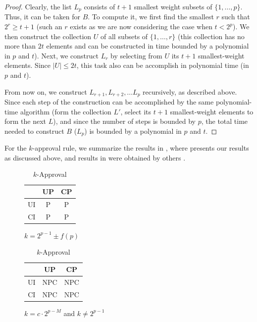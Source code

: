 \begin{proof}
Clearly, the list $L_p$ consists of $t+1$ smallest weight subsets of
$\{1,\ldots,p\}$. Thus, it can be taken for $B$. To compute it, we first
find the smallest $r$ such that $2^r\geq t+1$ (such an $r$ exists as
we are now considering the case when $t < 2^p$). We then construct the 
collection $U$ of all subsets of $\{1,\ldots, r\}$ (this collection 
has no more than $2t$ elements and can be constructed in time bounded 
by a polynomial in $p$ and $t$). Next, we construct $L_r$ by selecting 
from $U$ its $t+1$ smallest-weight elements. Since $|U|\leq 2t$, this task
also can be accomplish in polynomial time (in $p$ and $t$).

From now on, we construct $L_{r+1},L_{r+2},\ldots L_p$ recursively, as 
described above. Since each step of the construction can be accomplished
by the same polynomial-time algorithm (form the collection $L'$, select
its $t+1$ smallest-weight elements to form the next $L$), and since
the number of steps is bounded by $p$, the total time needed to construct
$B$ ($L_p$) is bounded by a polynomial in $p$ and $t$.  
\end{proof}


For the $k$-approval rule, we summarize the results in ,
where  presents our results as discussed above,
and results in  were obtained by others
\cite{lang:aggLP}.
\begin{table}
	\centering
  \begin{subfigure}[b]{0.5\textwidth}
		\centering
		\begin{tabular}[0.5\textwidth]{ | c | c | c | }
		  \hline
		    & UP & CP \\
		  \hline
		  UI & P & P \\
		  \hline
		  CI & P & P \\
		  \hline
		\end{tabular}
		\caption{$k=2^{p-1}\pm f(p)$}
		\label{tbl:kApp_comp_a}
	\end{subfigure}%
  \begin{subfigure}[b]{0.5\textwidth}
		\centering
		\begin{tabular}[0.5\textwidth]{ | c | c | c | }
		  \hline
		    & UP & CP \\
		  \hline
		  UI & NPC & NPC \\
		  \hline
		  CI & NPC & NPC \\
		  \hline
		\end{tabular}
		\caption{$k=c\cdot 2^{p-M}$ and $k \not = 2^{p-1}$}
		\label{tbl:kApp_comp_b}
	\end{subfigure}
	\caption{$k$-Approval}
	\label{tbl:kApp_comp}
\end{table}



